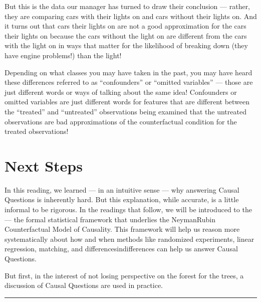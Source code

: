 \documentclass[letterpaper,10pt,english]{jupyterBook}
\begin{document}
\sphinxAtStartPar
But this is  the data our manager has turned to draw their conclusion — rather, they are comparing cars with their  lights on and cars without their  lights on. And it turns out that cars  their  lights on are not a good approximation for the cars  their  lights on because the cars without the light on are different from the cars with the light on in ways that matter for the likelihood of breaking down (they have engine problems!)  than the  light!

\sphinxAtStartPar
Depending on what classes you may have taken in the past, you may have heard these differences referred to as “confounders” or “omitted variables” — those are just different words or ways of talking about the same idea! Confounders or omitted variables are just different words for features that are different between the “treated” and “untreated” observations being examined that the untreated observations are bad approximations of the counter\sphinxhyphen{}factual condition for the treated observations!


\section{Next Steps}
\label{\detokenize{30_questions/30_causal_questions_theory:next-steps}}
\sphinxAtStartPar
In this reading, we learned — in an intuitive sense — why answering Causal Questions is inherently hard. But this explanation, while accurate, is a little informal to be rigorous. In the readings that follow, we will be introduced to the  — the formal statistical framework that underlies the Neyman\sphinxhyphen{}Rubin Counterfactual Model of Causality. This framework will help us reason more systematically about how and when methods like randomized experiments, linear regression, matching, and differences\sphinxhyphen{}in\sphinxhyphen{}differences can help us answer Causal Questions.

\sphinxAtStartPar
But first, in the interest of not losing perspective on the forest for the trees, a discussion of  Causal Questions are used in practice.


\bigskip\hrule\bigskip


\sphinxstepscope
\end{document}
